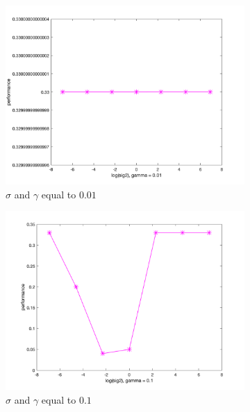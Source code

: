 \documentclass[a4paper, 11pt, one column]{article}
\begin{document}
\begin{figure}[]
        \begin{subfigure}{0.33\linewidth}
            \includegraphics[width=\linewidth]{images/10f_sig2_g_0.01.png}
            \caption{$\sigma$ and $\gamma$ equal to $0.01$}
        \end{subfigure}
        \begin{subfigure}{0.33\linewidth}
            \includegraphics[width=\linewidth]{images/10f_sig2_g_0.1.png}
            \caption{$\sigma$ and $\gamma$ equal to $0.1$}
        \end{subfigure}
        \begin{subfigure}{0.33\linewidth}

\end{subfigure}
\end{figure}
\end{document}
